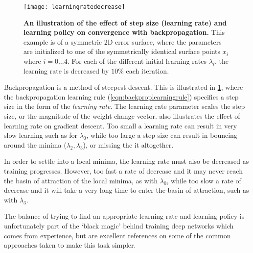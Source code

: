 \documentclass[thesis]{subfiles}
\begin{document}
\begin{figure}[tbp]
\centering
\texttt{[image: learningratedecrease]}
\caption[Learning rate and convergence.]{\textbf{An illustration of the effect of step size (learning rate) and learning policy on convergence with backpropagation.} This example is of a symmetric 2D error surface, where the parameters are initialized to one of the symmetrically identical surface points $x_i$ where $i=0\ldots4$. For each of the different initial learning rates $\lambda_i$, the learning rate is decreased by $10\%$ each iteration.}\label{fig:learningrate}
\end{figure}
Backpropagation is a method of steepest descent. This is illustrated in \cref{fig:learningrate}, where the backpropagation learning rule (\cref{eqn:backproplearningrule}) specifies a step size in the form of the \emph{learning rate}. The learning rate parameter scales the step size, or the magnitude of the weight change vector.  also illustrates the effect of learning rate on gradient descent. Too small a learning rate can result in very slow learning such as for $\lambda_0$, while too large a step size can result in bouncing around the minima ($\lambda_2, \lambda_3$), or missing the it altogether. 

In order to settle into a local minima, the learning rate must also be decreased as training progresses. However, too fast a rate of decrease and it may never reach the basin of attraction of the local minima, as with $\lambda_0$, while too slow a rate of decrease and it will take a very long time to enter the basin of attraction, such as with $\lambda_3$. 

The balance of trying to find an appropriate learning rate and learning policy is unfortunately part of the `black magic' behind training deep networks which comes from experience, but \citep{Bottou2012sgdtricks, goodfellow2016deep} are excellent references on some of the common approaches taken to make this task simpler.
\end{document}
